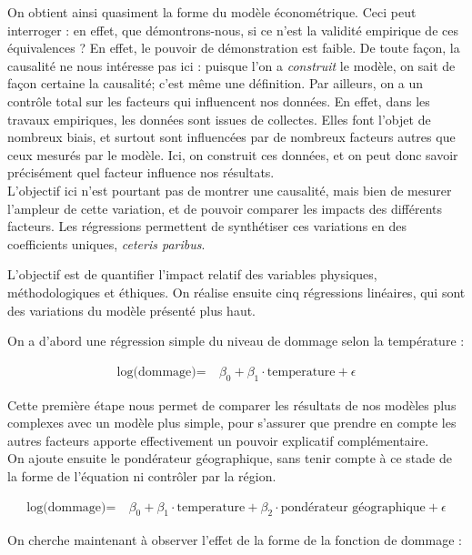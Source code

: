 On obtient ainsi quasiment la forme du modèle économétrique. Ceci peut interroger : en effet, que démontrons-nous, si ce n'est la validité empirique de ces équivalences ? En effet, le pouvoir de démonstration est faible. De toute façon, la causalité ne nous intéresse pas ici :  puisque l'on a \emph{construit} le modèle, on sait de façon certaine la causalité; c'est même une définition. Par ailleurs, on a un contrôle total sur les facteurs qui influencent nos données. En effet, dans les travaux empiriques, les données sont issues de collectes. Elles font l'objet de nombreux biais, et surtout sont influencées par de nombreux facteurs autres que ceux mesurés par le modèle. Ici, on construit ces données, et on peut donc savoir précisément quel facteur influence nos résultats. \\

L'objectif ici n'est pourtant pas de montrer une causalité, mais bien de mesurer l'ampleur de cette variation, et de pouvoir comparer les impacts des différents facteurs. Les régressions permettent de synthétiser ces variations en des coefficients uniques, \emph{ceteris paribus}.

L'objectif est de quantifier l'impact relatif des variables physiques, méthodologiques et éthiques. On réalise ensuite cinq régressions linéaires, qui sont des variations du modèle présenté plus haut. 


On a d'abord une régression simple du niveau de dommage selon la température : 

\begin{align}
\text{log(dommage)} = & \ \beta_0  + \beta_1 \cdot \text{temperature}  + \epsilon
\end{align}

Cette première étape nous permet de comparer les résultats de nos modèles plus complexes avec un modèle plus simple, pour s'assurer que prendre en compte les autres facteurs apporte effectivement un pouvoir explicatif complémentaire.  \\

On ajoute ensuite le pondérateur géographique, sans tenir compte à ce stade de la forme de l'équation ni contrôler par la région. 

\begin{align}
\text{log(dommage)} = & \ \beta_0  + \beta_1 \cdot \text{temperature}  + \beta_2 \cdot \text{pondérateur géographique} + \epsilon
\end{align}

On cherche maintenant à observer l'effet de la forme de la fonction de dommage : 

